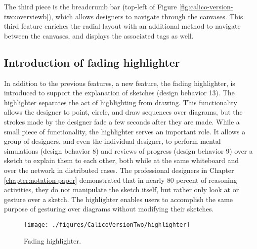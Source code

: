 The third piece is the breadcrumb bar (top-left of Figure \ref{fig:calico-version-two:overviewb}), which allows designers to navigate through the canvases. This third feature enriches the radial layout with an additional method to navigate between the canvases, and displays the associated tags as well.

\subsection{Introduction of fading highlighter}

In addition to the previous features, a new feature, the fading highlighter, is introduced to support the explanation of sketches (design behavior 13). The highlighter separates the act of highlighting from drawing. This functionality allows the designer to point, circle, and draw sequences over diagrams, but the strokes made by the designer fade a few seconds after they are made. While a small piece of functionality, the highlighter serves an important role. It allows a group of designers, and even the individual designer, to perform mental simulations (design behavior 8) and reviews of progress (design behavior 9) over a sketch to explain them to each other, both while at the same whiteboard and over the network in distributed cases. The professional designers in Chapter \ref{chapter:notation-paper} demonstrated that in nearly 80 percent of reasoning activities, they do not manipulate the sketch itself, but rather only look at or gesture over a sketch. The highlighter enables users to accomplish the same purpose of gesturing over diagrams without modifying their sketches.

\begin{figure*}[tbh]
  \centering
  \texttt{[image: ./figures/CalicoVersionTwo/highlighter]}
  \caption{Fading highlighter.}
  \label{fig:calico-version-two:overviewd}
\end{figure*}


